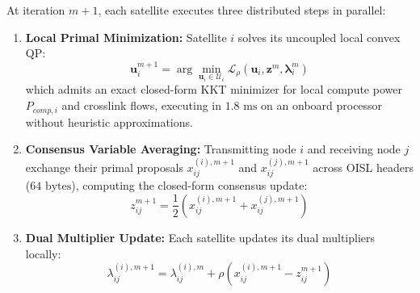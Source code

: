 \documentclass[journal]{IEEEtran}
\begin{document}
At iteration $m+1$, each satellite executes three distributed steps in parallel:
\begin{enumerate}
    \item \textbf{Local Primal Minimization:} Satellite $i$ solves its uncoupled local convex QP:
    \begin{equation}
        \mathbf{u}_i^{m+1} = \arg\min_{\mathbf{u}_i \in \mathcal{U}_i} \mathcal{L}_{\rho}(\mathbf{u}_i, \mathbf{z}^m, \boldsymbol{\lambda}_i^m)
        \label{eq:admm_primal}
    \end{equation}
    which admits an exact closed-form KKT minimizer for local compute power $P_{comp,i}$ and crosslink flows, executing in $1.8\text{ ms}$ on an onboard processor without heuristic approximations.
    \item \textbf{Consensus Variable Averaging:} Transmitting node $i$ and receiving node $j$ exchange their primal proposals $x_{ij}^{(i),m+1}$ and $x_{ij}^{(j),m+1}$ across OISL headers ($64\text{ bytes}$), computing the closed-form consensus update:
    \begin{equation}
        z_{ij}^{m+1} = \frac{1}{2} \left(x_{ij}^{(i),m+1} + x_{ij}^{(j),m+1}\right)
        \label{eq:admm_consensus}
    \end{equation}
    \item \textbf{Dual Multiplier Update:} Each satellite updates its dual multipliers locally:
    \begin{equation}
        \lambda_{ij}^{(i),m+1} = \lambda_{ij}^{(i),m} + \rho \left(x_{ij}^{(i),m+1} - z_{ij}^{m+1}\right)
        \label{eq:admm_dual}
    \end{equation}
\end{enumerate}
\end{document}
